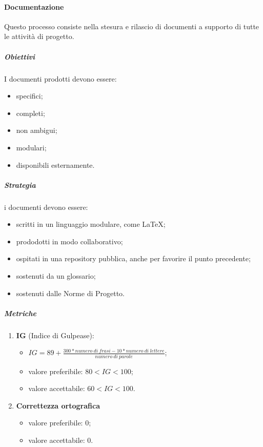         \paragraph{Documentazione}
            Questo processo consiste nella stesura e rilascio di documenti a supporto di tutte le attività di progetto.
            \subparagraph{Obiettivi}
                I documenti prodotti devono essere:
                \begin{itemize}
                    \item specifici;
                    \item completi;
                    \item non ambigui;
                    \item modulari;
                    \item disponibili esternamente.
                \end{itemize}
            \subparagraph{Strategia} i documenti devono essere:
                \begin{itemize}
                    \item scritti in un linguaggio modulare, come \LaTeX;
                    \item prododotti in modo collaborativo;
                    \item ospitati in una repository pubblica, anche per favorire il punto precedente;
                    \item sostenuti da un glossario;
                    \item sostenuti dalle Norme di Progetto.
                \end{itemize}
            \subparagraph{Metriche}
            \begin{enumerate}
                \item \textbf{IG} (Indice di Gulpease):
                \begin{itemize}
                    \item $IG = 89+\frac{300*numero\ di\ frasi-10*numero\ di\ lettere}{numero\ di\ parole}$;
                    \item valore preferibile: $80< IG < 100$;
                    \item valore accettabile: $60< IG < 100$.
                \end{itemize}
                \item \textbf{Correttezza ortografica}
                \begin{itemize}
                    \item valore preferibile: $0$;
                    \item valore accettabile: $0$.
                \end{itemize}
            \end{enumerate}
